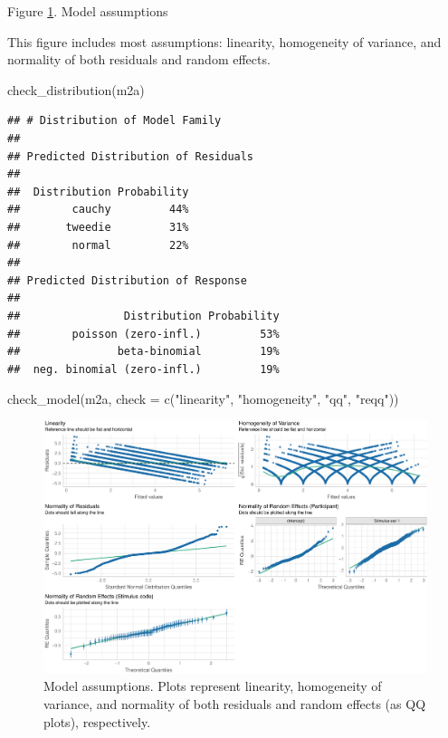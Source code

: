 \documentclass[
  bookmarksnumbered]{article}
\newenvironment{Shaded}{\begin{snugshade}}{\end{snugshade}}
\newcommand{\AttributeTok}[1]{\textcolor[rgb]{0.80,0.80,0.80}{#1}}
\newcommand{\FunctionTok}[1]{\textcolor[rgb]{0.94,0.94,0.56}{#1}}
\newcommand{\NormalTok}[1]{\textcolor[rgb]{0.80,0.80,0.80}{#1}}
\newcommand{\StringTok}[1]{\textcolor[rgb]{0.80,0.58,0.58}{#1}}
\begin{document}
Figure \ref{fig:assu-m2a}. Model assumptions

This figure includes most assumptions: linearity, homogeneity of variance, and normality of both residuals and random effects.

\begin{Shaded}
\begin{Highlighting}[]
\FunctionTok{check\_distribution}\NormalTok{(m2a)}
\end{Highlighting}
\end{Shaded}

\begin{verbatim}
## # Distribution of Model Family
## 
## Predicted Distribution of Residuals
## 
##  Distribution Probability
##        cauchy         44%
##       tweedie         31%
##        normal         22%
## 
## Predicted Distribution of Response
## 
##                Distribution Probability
##        poisson (zero-infl.)         53%
##               beta-binomial         19%
##  neg. binomial (zero-infl.)         19%
\end{verbatim}

\begin{Shaded}
\begin{Highlighting}[]
\FunctionTok{check\_model}\NormalTok{(m2a,}
            \AttributeTok{check =} \FunctionTok{c}\NormalTok{(}\StringTok{"linearity"}\NormalTok{, }\StringTok{"homogeneity"}\NormalTok{, }\StringTok{"qq"}\NormalTok{, }\StringTok{"reqq"}\NormalTok{))}
\end{Highlighting}
\end{Shaded}

\begin{figure}
\centering
\includegraphics{Deseo_excitacion_sexual_files/figure-latex/assu-m2a-1.pdf}
\caption{\label{fig:assu-m2a}Model assumptions. Plots represent linearity, homogeneity of variance, and normality of both residuals and random effects (as QQ plots), respectively.}
\end{figure}
\end{document}
